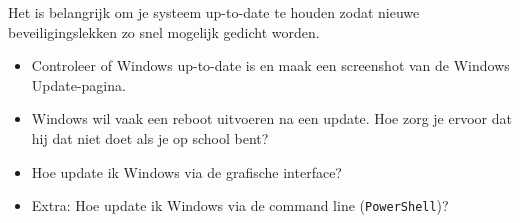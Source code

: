 Het is belangrijk om je systeem up-to-date te houden zodat nieuwe beveiligingslekken zo snel mogelijk gedicht worden.
\begin{itemize}
\item Controleer of Windows up-to-date is en maak een screenshot van de Windows Update-pagina.
\item Windows wil vaak een reboot uitvoeren na een update. Hoe zorg je ervoor dat hij dat niet doet als je op school bent?
\item Hoe update ik Windows via de grafische interface?
\item Extra: Hoe update ik Windows via de command line (\texttt{PowerShell})?
\end{itemize}

